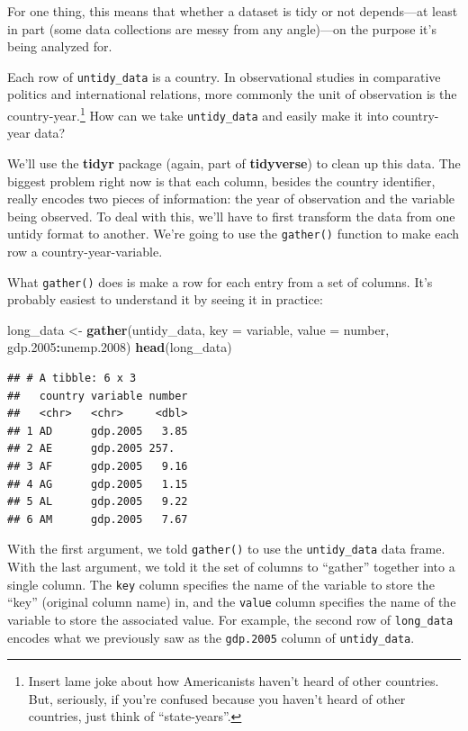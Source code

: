 \documentclass[
  12pt,
  oneside,openany]{book}
\newenvironment{Shaded}{\begin{snugshade}}{\end{snugshade}}
\newcommand{\DataTypeTok}[1]{\textcolor[rgb]{0.13,0.29,0.53}{#1}}
\newcommand{\FloatTok}[1]{\textcolor[rgb]{0.00,0.00,0.81}{#1}}
\newcommand{\KeywordTok}[1]{\textcolor[rgb]{0.13,0.29,0.53}{\textbf{#1}}}
\newcommand{\NormalTok}[1]{#1}
\newcommand{\OperatorTok}[1]{\textcolor[rgb]{0.81,0.36,0.00}{\textbf{#1}}}
\newcommand{\StringTok}[1]{\textcolor[rgb]{0.31,0.60,0.02}{#1}}
\begin{document}
For one thing, this means that whether a dataset is tidy or not depends---at least in part (some data collections are messy from any angle)---on the purpose it's being analyzed for.

Each row of \texttt{untidy\_data} is a country. In observational studies in comparative politics and international relations, more commonly the unit of observation is the country-year.\footnote{Insert lame joke about how Americanists haven't heard of other countries. But, seriously, if you're confused because you haven't heard of other countries, just think of ``state-years''.} How can we take \texttt{untidy\_data} and easily make it into country-year data?

We'll use the \textbf{tidyr} package (again, part of \textbf{tidyverse}) to clean up this data. The biggest problem right now is that each column, besides the country identifier, really encodes two pieces of information: the year of observation and the variable being observed. To deal with this, we'll have to first transform the data from one untidy format to another. We're going to use the \texttt{gather()} function to make each row a country-year-variable.

What \texttt{gather()} does is make a row for each entry from a set of columns. It's probably easiest to understand it by seeing it in practice:

\begin{Shaded}
\begin{Highlighting}[]
\NormalTok{long\_data <{-}}\StringTok{ }\KeywordTok{gather}\NormalTok{(untidy\_data,}
                    \DataTypeTok{key =}\NormalTok{ variable,}
                    \DataTypeTok{value =}\NormalTok{ number,}
\NormalTok{                    gdp}\FloatTok{.2005}\OperatorTok{:}\NormalTok{unemp}\FloatTok{.2008}\NormalTok{)}
\KeywordTok{head}\NormalTok{(long\_data)}
\end{Highlighting}
\end{Shaded}

\begin{verbatim}
## # A tibble: 6 x 3
##   country variable number
##   <chr>   <chr>     <dbl>
## 1 AD      gdp.2005   3.85
## 2 AE      gdp.2005 257.  
## 3 AF      gdp.2005   9.16
## 4 AG      gdp.2005   1.15
## 5 AL      gdp.2005   9.22
## 6 AM      gdp.2005   7.67
\end{verbatim}

With the first argument, we told \texttt{gather()} to use the \texttt{untidy\_data} data frame. With the last argument, we told it the set of columns to ``gather'' together into a single column. The \texttt{key} column specifies the name of the variable to store the ``key'' (original column name) in, and the \texttt{value} column specifies the name of the variable to store the associated value. For example, the second row of \texttt{long\_data} encodes what we previously saw as the \texttt{gdp.2005} column of \texttt{untidy\_data}.
\end{document}
